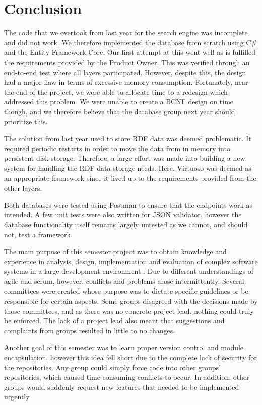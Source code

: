 \chapter{Conclusion}\label{ch:conclusion}
The code that we overtook from last year for the search engine was incomplete and did not work.
We therefore implemented the database from scratch using C\# and the Entity Framework Core.
Our first attempt at this went well as is fulfilled the requirements provided by the Product Owner. 
This was verified through an end-to-end test where all \knox{} layers participated.
However, despite this, the design had a major flaw in terms of excessive memory consumption. 
Fortunately, near the end of the project, we were able to allocate time to a redesign which addressed this problem.
We were unable to create a BCNF design on time though, and we therefore believe that the database group next year should prioritize this.

The solution from last year used to store RDF data was deemed problematic.
It required periodic restarts in order to move the data from in memory into persistent disk storage.
Therefore, a large effort was made into building a new system for handling the \knox{} RDF data storage needs. 
Here, Virtuoso was deemed as an appropriate framework since it lived up to the requirements provided from the other layers. 

Both databases were tested using Postman to ensure that the endpoints work as intended.
A few unit tests were also written for JSON validator, however the database functionality itself remains largely untested as we cannot, and should not, test a framework.

The main purpose of this semester project was to obtain knowledge and experience in analysis, design, implementation and evaluation of complex software systems in a large development environment \cite{AAULearningGoals5thSemester}.
Due to different understandings of agile and scrum, however, conflicts and problems arose intermittently.
Several committees were created whose purpose was to dictate specific guidelines or be responsible for certain aspects.
Some groups disagreed with the decisions made by those committees, and as there was no concrete project lead, nothing could truly be enforced. 
The lack of a project lead also meant that suggestions and complaints from groups resulted in little to no changes.


Another goal of this semester was to learn proper version control and module encapsulation, however this idea fell short due to the complete lack of security for the \knox{} repositories. 
Any group could simply force code into other groups' repositories, which caused time-consuming conflicts to occur.
In addition, other groups would suddenly request new features that needed to be implemented urgently.


